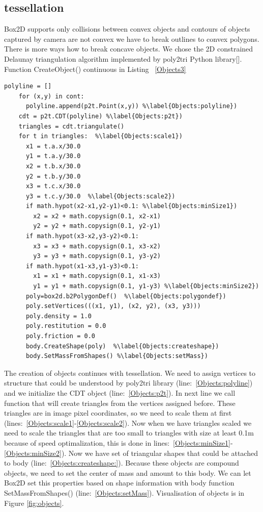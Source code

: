 \documentclass{ifacconf}
\begin{document}
\subsection{tessellation}
Box2D supports only collisions between convex objects and contours of objects
captured by camera are not convex we have to break outlines to convex polygons.
There is more ways how to break concave objects. We chose the 2D constrained
Delaunay triangulation algorithm implemented by poly2tri Python
library[\cite{Delauanay}]. Function CreateObject() continuous in Listing~
\ref{Objects3}
\begin{lstlisting}[name=Objects,firstnumber=auto,label=Objects3,caption=Creation
 of objects]
    polyline = []
    for (x,y) in cont:
      polyline.append(p2t.Point(x,y)) %\label{Objects:polyline})
    cdt = p2t.CDT(polyline) %\label{Objects:p2t})
    triangles = cdt.triangulate()
    for t in triangles:  %\label{Objects:scale1})
      x1 = t.a.x/30.0
      y1 = t.a.y/30.0
      x2 = t.b.x/30.0
      y2 = t.b.y/30.0
      x3 = t.c.x/30.0
      y3 = t.c.y/30.0  %\label{Objects:scale2})
      if math.hypot(x2-x1,y2-y1)<0.1: %\label{Objects:minSize1})
        x2 = x2 + math.copysign(0.1, x2-x1)
        y2 = y2 + math.copysign(0.1, y2-y1)
      if math.hypot(x3-x2,y3-y2)<0.1:
        x3 = x3 + math.copysign(0.1, x3-x2)
        y3 = y3 + math.copysign(0.1, y3-y2)
      if math.hypot(x1-x3,y1-y3)<0.1:
        x1 = x1 + math.copysign(0.1, x1-x3)
        y1 = y1 + math.copysign(0.1, y1-y3) %\label{Objects:minSize2})
      poly=box2d.b2PolygonDef()  %\label{Objects:polygondef})
      poly.setVertices(((x1, y1), (x2, y2), (x3, y3)))
      poly.density = 1.0
      poly.restitution = 0.0
      poly.friction = 0.0
      body.CreateShape(poly)  %\label{Objects:createshape})
      body.SetMassFromShapes() %\label{Objects:setMass})
\end{lstlisting}
The creation of objects continues with tessellation. We need to assign vertices
to structure that could be understood by poly2tri library
(line:~\ref{Objects:polyline}) and we initialize the CDT object
(line:~\ref{Objects:p2t}). In next line we call function that will create
triangles from the vertices assigned before. These triangles are in image pixel
coordinates, so we need to scale them at first
(lines:~\ref{Objects:scale1}-\ref{Objects:scale2}). Now when we have triangles
scaled we need to scale the triangles that are too small to triangles with size
at least 0.1m because of speed optimalization, this is done in
lines:~\ref{Objects:minSize1}-\ref{Objects:minSize2}). Now we have set of
triangular shapes that could be attached to body
(line:~\ref{Objects:createshape:}). Because these objects are compound objects,
we need to set the center of mass and amount to this body. We can let Box2D set
this properties based on shape information with body function
SetMassFromShapes() (line:~\ref{Objects:setMass}). Visualisation of objects is
in Figure \ref{fig:objects}.
\end{document}
